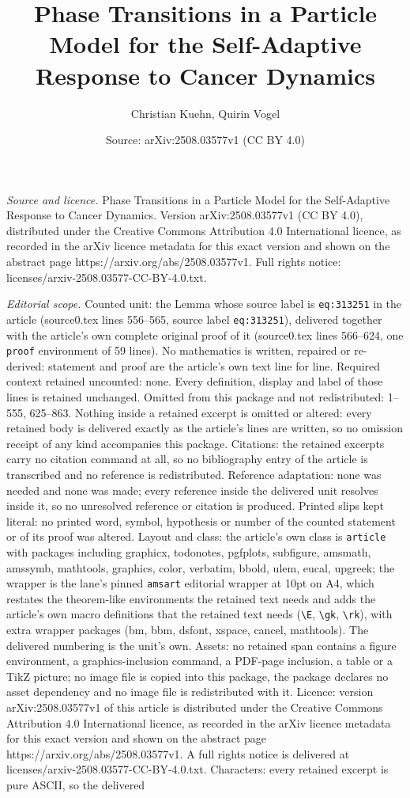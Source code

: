 \documentclass[10pt,a4paper]{amsart}
\title[Phase Transitions in a Particle Model for the Self-Adaptive ]{Phase Transitions in a Particle Model for the Self-Adaptive Response to Cancer Dynamics}
\author{Christian Kuehn, Quirin Vogel}
\date{Source: arXiv:2508.03577v1 (CC BY 4.0)}
\begin{document}
\maketitle

\noindent\emph{Source and licence.} Phase Transitions in a Particle Model for the Self-Adaptive Response to Cancer Dynamics. Version arXiv:2508.03577v1 (CC BY 4.0), distributed under the Creative Commons Attribution 4.0 International licence, as recorded in the arXiv licence metadata for this exact version and shown on the abstract page https://arxiv.org/abs/2508.03577v1. Full rights notice: licenses/arxiv-2508.03577-CC-BY-4.0.txt.\par\smallskip

\noindent\textit{Editorial scope.} Counted unit: the Lemma whose source label is \texttt{eq:313251} in the article (source0.tex lines 556--565, source label \texttt{eq:313251}), delivered together with the article's own complete original proof of it (source0.tex lines 566--624, one \texttt{proof} environment of 59 lines). No mathematics is written, repaired or re-derived: statement and proof are the article's own text line for line. Required context retained uncounted: none. Every definition, display and label of those lines is retained unchanged. Omitted from this package and not redistributed: 1--555, 625--863. Nothing inside a retained excerpt is omitted or altered: every retained body is delivered exactly as the article's lines are written, so no omission receipt of any kind accompanies this package. Citations: the retained excerpts carry no citation command at all, so no bibliography entry of the article is transcribed and no reference is redistributed. Reference adaptation: none was needed and none was made; every reference inside the delivered unit resolves inside it, so no unresolved reference or citation is produced. Printed slips kept literal: no printed word, symbol, hypothesis or number of the counted statement or of its proof was altered. Layout and class: the article's own class is \texttt{article} with packages including graphicx, todonotes, pgfplots, subfigure, amsmath, amssymb, mathtools, graphics, color, verbatim, bbold, ulem, eucal, upgreek; the wrapper is the lane's pinned \texttt{amsart} editorial wrapper at 10pt on A4, which restates the theorem-like environments the retained text needs and adds the article's own macro definitions that the retained text needs (\texttt{\textbackslash E}, \texttt{\textbackslash gk}, \texttt{\textbackslash rk}), with extra wrapper packages (bm, bbm, dsfont, xspace, cancel, mathtools). The delivered numbering is the unit's own. Assets: no retained span contains a figure environment, a graphics-inclusion command, a PDF-page inclusion, a table or a TikZ picture; no image file is copied into this package, the package declares no asset dependency and no image file is redistributed with it. Licence: version arXiv:2508.03577v1 of this article is distributed under the Creative Commons Attribution 4.0 International licence, as recorded in the arXiv licence metadata for this exact version and shown on the abstract page https://arxiv.org/abs/2508.03577v1. A full rights notice is delivered at licenses/arxiv-2508.03577-CC-BY-4.0.txt. Characters: every retained excerpt is pure ASCII, so the delivered 
\end{document}
